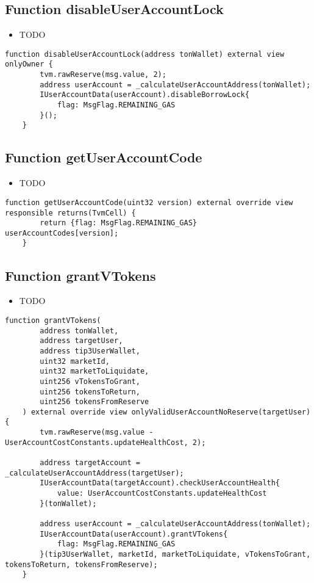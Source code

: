 \subsection{Function disableUserAccountLock}

\noindent\begin{itemize}
\item TODO
\end{itemize}

\begin{lstlisting}[firstnumber=525]
    function disableUserAccountLock(address tonWallet) external view onlyOwner {
        tvm.rawReserve(msg.value, 2);
        address userAccount = _calculateUserAccountAddress(tonWallet);
        IUserAccountData(userAccount).disableBorrowLock{
            flag: MsgFlag.REMAINING_GAS
        }();
    }
\end{lstlisting}

\subsection{Function getUserAccountCode}

\noindent\begin{itemize}
\item TODO
\end{itemize}

\begin{lstlisting}[firstnumber=521]
    function getUserAccountCode(uint32 version) external override view responsible returns(TvmCell) {
        return {flag: MsgFlag.REMAINING_GAS} userAccountCodes[version];
    }
\end{lstlisting}

\subsection{Function grantVTokens}

\noindent\begin{itemize}
\item TODO
\end{itemize}

\begin{lstlisting}[firstnumber=363]
    function grantVTokens(
        address tonWallet, 
        address targetUser,
        address tip3UserWallet,
        uint32 marketId, 
        uint32 marketToLiquidate,
        uint256 vTokensToGrant, 
        uint256 tokensToReturn,
        uint256 tokensFromReserve
    ) external override view onlyValidUserAccountNoReserve(targetUser) {
        tvm.rawReserve(msg.value - UserAccountCostConstants.updateHealthCost, 2);
        
        address targetAccount = _calculateUserAccountAddress(targetUser);
        IUserAccountData(targetAccount).checkUserAccountHealth{
            value: UserAccountCostConstants.updateHealthCost
        }(tonWallet);

        address userAccount = _calculateUserAccountAddress(tonWallet);
        IUserAccountData(userAccount).grantVTokens{
            flag: MsgFlag.REMAINING_GAS
        }(tip3UserWallet, marketId, marketToLiquidate, vTokensToGrant, tokensToReturn, tokensFromReserve);
    }
\end{lstlisting}

